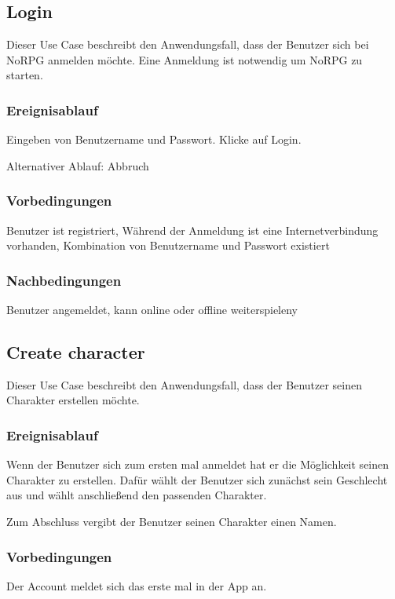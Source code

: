 	\subsection{Login}
		Dieser Use Case beschreibt den Anwendungsfall, dass der Benutzer sich bei NoRPG anmelden möchte. Eine Anmeldung ist notwendig um NoRPG zu starten. 
			
		\subsubsection{Ereignisablauf}
			Eingeben von Benutzername und Passwort.	Klicke auf Login.
			
			Alternativer Ablauf: Abbruch
			
		\subsubsection{Vorbedingungen}
			Benutzer ist registriert, Während der Anmeldung ist eine Internetverbindung vorhanden, Kombination von Benutzername und Passwort existiert
			
		\subsubsection{Nachbedingungen}
			Benutzer angemeldet, kann online oder offline weiterspieleny
	
	\subsection{Create character}
		Dieser Use Case beschreibt den Anwendungsfall, dass der Benutzer seinen Charakter erstellen möchte.
			
		\subsubsection{Ereignisablauf}
			Wenn der Benutzer sich zum ersten mal anmeldet hat er die Möglichkeit seinen Charakter zu erstellen. Dafür wählt der Benutzer sich zunächst sein Geschlecht aus und wählt anschließend den passenden Charakter.
			
			Zum Abschluss vergibt der Benutzer seinen Charakter einen Namen.
	
		\subsubsection{Vorbedingungen}
			Der Account meldet sich das erste mal in der App an.
			
